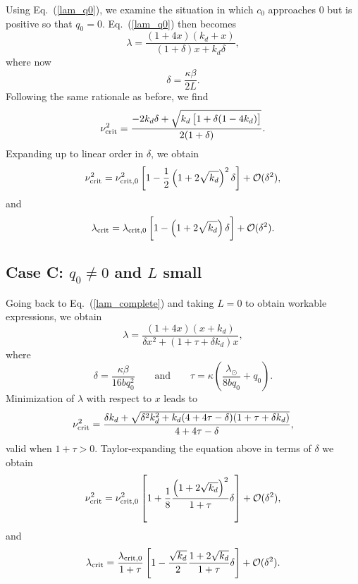Using Eq.~(\ref{lam_q0}), we examine the situation in which $c_0$ approaches 0 but is positive so that $q_0=0$. Eq.~(\ref{lam_q0}) then becomes
\begin{equation}
	\lambda = \frac{(1+4x)(k_d + x)}{(1+\delta) x + k_d \delta},
\end{equation}
where now
\begin{equation}
	\delta = \frac{\kappa \beta}{2L}.
\end{equation}
Following the same rationale as before, we find
\begin{equation}
	\nu^2_{\rm crit} = \frac{-2 k_d \delta + \sqrt{k_d\left[1 + \delta(1-4k_d) \right]}}{2(1+\delta)}.
\end{equation}
Expanding up to linear order in $\delta$, we obtain
\begin{equation}
	\nu^2_{\rm crit} = \nu_{\rm crit,0}^2 \left[1 - \frac{1}{2}\left( 1 + 2 \sqrt{k_d} \right)^2 \delta \right] + \mathcal{O}(\delta^2),
\end{equation}
and
\begin{equation}
	\lambda_{\rm crit} = \lambda_{\rm crit,0} \left[1 - \left( 1 + 2 \sqrt{k_d} \right) \delta \right] + \mathcal{O}(\delta^2).
\end{equation}

\subsection{Case C: $q_0\ne0$ and $L$ small} \label{qne0}

Going back to Eq.~(\ref{lam_complete}) and taking $L=0$ to obtain workable expressions, we obtain
\begin{equation}
	\lambda = \frac{(1+4x)(x+k_d)}{\delta x^2 + (1 + \tau  + \delta k_d)x},
\end{equation}
where
\begin{equation}
	\delta  = \frac{\kappa \beta}{16 b q_0^2} \mbox{~~~~~~and~~~~~~} \tau = \kappa\left(\frac{ \lambda_\odot}{8bq_0} +   q_0\right).
\end{equation}
Minimization of $\lambda$ with respect to $x$ leads to
\begin{equation}
	\nu_{\rm crit}^2 = \frac{\delta k_d + \sqrt{\delta^2 k_d^2 + k_d(4+4\tau - \delta)(1+\tau+\delta k_d)}}{4+4\tau-\delta},
\end{equation}
valid when $1+\tau>0$. Taylor-expanding the equation above in terms of $\delta$ we obtain
\begin{equation}
	\nu^2_{\rm crit} = \nu_{\rm crit,0}^2 \left[1 + \frac{1}{8}\frac{\left( 1 + 2 \sqrt{k_d} \right)^2}{1+\tau} \delta \right] + \mathcal{O}(\delta^2),
\end{equation}
and
\begin{equation}
	\lambda_{\rm crit} = \frac{\lambda_{\rm crit,0}}{1+\tau} \left[1 - \frac{\sqrt{k_d}}{2}\frac{ 1 + 2 \sqrt{k_d} }{1+\tau} \delta \right] + \mathcal{O}(\delta^2).
\end{equation}

